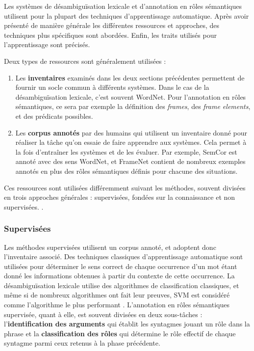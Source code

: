 Les systèmes de désambiguïsation lexicale et d'annotation en rôles sémantiques
utilisent pour la plupart des techniques d'apprentissage automatique. Après
avoir présenté de manière générale les différentes ressources et approches, des
techniques plus spécifiques sont abordées. Enfin, les traits utilisés pour
l'apprentissage sont précisés.

Deux types de ressources sont généralement utilisées :

\begin{enumerate}

    \item Les \textbf{inventaires} examinés dans les deux sections précédentes
        permettent de fournir un socle commun à différents systèmes. Dans le
        cas de la désambiguïsation lexicale, c'est souvent WordNet. Pour
        l'annotation en rôles sémantiques, ce sera par exemple la définition
        des \textit{frames}, des \textit{frame elements}, et des prédicats
        possibles.

    \item Les \textbf{corpus annotés} par des humains qui utilisent un
        inventaire donné pour réaliser la tâche qu'on essaie de faire apprendre
        aux systèmes. Cela permet à la fois d'entraîner les systèmes et de les
        évaluer. Par exemple, SemCor est annoté avec des sens WordNet, et
        FrameNet contient de nombreux exemples annotés en plus des rôles
        sémantiques définis pour chacune des situations.

\end{enumerate}

Ces ressources sont utilisées différemment suivant les méthodes, souvent
divisées en trois approches générales : supervisées, fondées sur la
connaissance et non supervisées. \citep{navigli2009word}.

\subsubsection{Supervisées}

Les méthodes supervisées utilisent un corpus annoté, et adoptent donc
l'inventaire associé. Des techniques classiques d'apprentissage automatique
sont utilisées pour déterminer le sens correct de chaque occurrence d'un mot
étant donné les informations obtenues à partir du contexte de cette occurrence.
La désambiguïsation lexicale utilise des algorithmes de classification
classiques, et même si de nombreux algorithmes ont fait leur preuves, SVM est
considéré comme l'algorithme le plus performant \cite{navigli2012quick}.
L'annotation en rôles sémantiques supervisée, quant à elle, est souvent
divisées en deux sous-tâches : l'\textbf{identification des arguments} qui
établit les syntagmes jouant un rôle dans la phrase et la
\textbf{classification des rôles} qui détermine le rôle effectif de chaque
syntagme parmi ceux retenus à la phase précédente.

